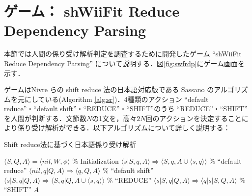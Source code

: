 \documentclass[japanese]{jnlp_1.4}
\begin{document}
\section{ゲーム： shWiiFit Reduce Dependency Parsing} \label{sec:4}

本節では人間の係り受け解析判定を調査するために開発したゲーム ``shWiiFit Reduce Dependency Parsing'' について説明する．図\ref{fig:swfrdp}にゲーム画面を示す．

ゲームはNivre らの shift reduce 法\cite{Nivre03,Nivre04}の日本語対応版である Sassano のアルゴリズムを元にしている(Algorithm \ref{alg:sr})．4種類のアクション ``default reduce''・``default shift''・``REDUCE''・``SHIFT''のうち ``REDUCE''・``SHIFT'' を人間が判断する．文節数$N$の1文を，高々$2N$回のアクションを決定することにより係り受け解析ができる．以下アルゴリズムについて詳しく説明する：

\begin{algorithm}[tb]
\caption{Shift reduce法に基づく日本語係り受け解析 \label{alg:sr}} \small
\begin{algorithmic}
\STATE $\langle S, Q, A \rangle = \langle nil, W, \phi \rangle$ \% Initialization
\REPEAT
{} 
\STATE $\langle s|S, q, A \rangle \Rightarrow \langle S, q, A \cup \langle s,q \rangle \rangle$   \% ``default reduce''
\STATE $\langle nil, q|Q, A \rangle \Rightarrow \langle q, Q, A \rangle$ \% ``default shift''
\ELSE
{} 
\STATE $\langle s|S, q|Q, A \rangle \Rightarrow \langle S, q|Q, A \cup \langle s,q \rangle \rangle$  \% ``REDUCE''
\ELSE
\STATE $\langle s|S, q|Q, A \rangle \Rightarrow \langle q|s|S, Q, A \rangle$  \% ``SHIFT''
\ENDIF
\ENDIF
{}
\RETURN $A$
\end{algorithmic}
\end{algorithm}
\end{document}
